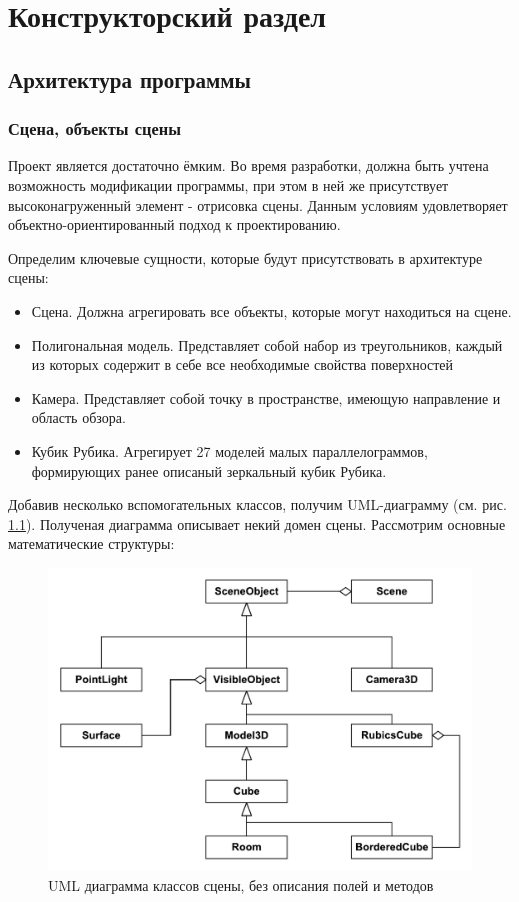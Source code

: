 \documentclass[a4paper, 14pt]{report} %
\begin{document}
	\chapter{Конструкторский раздел}
	\section{Архитектура программы}
	\subsection{Сцена, объекты сцены}
	Проект является достаточно ёмким. Во время разработки, должна быть учтена возможность модификации программы, при этом в ней же присутствует высоконагруженный элемент - отрисовка сцены. Данным условиям удовлетворяет объектно-ориентированный подход к проектированию.
	
	Определим ключевые сущности, которые будут присутствовать в архитектуре сцены:
	\begin{itemize}
		\item Сцена. Должна агрегировать все объекты, которые могут находиться на сцене.
		\item Полигональная модель. Представляет собой набор из треугольников, каждый из которых содержит в себе все необходимые свойства поверхностей
		\item Камера. Представляет собой точку в пространстве, имеющую направление и область обзора.
		\item Кубик Рубика. Агрегирует 27 моделей малых параллелограммов, формирующих ранее описаный зеркальный кубик Рубика.
	\end{itemize}

	Добавив несколько вспомогательных классов, получим UML-диаграмму (см. рис. \ref{fig:uml_scene}). Полученая диаграмма описывает некий домен сцены. Рассмотрим основные математические структуры:
	\begin{figure}[ht]
		\centering
		\includegraphics[width=1\linewidth]{uml_scene}
		\caption{UML диаграмма классов сцены, без описания полей и методов}
		\label{fig:uml_scene}
	\end{figure}
	
\end{document}
